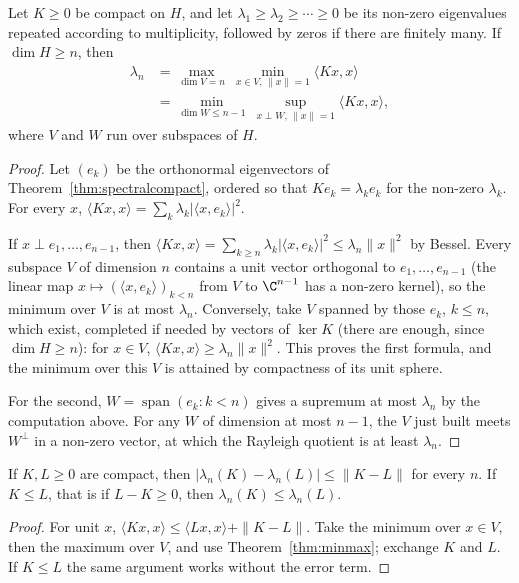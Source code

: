 \begin{theorem}\label{thm:minmax}
Let $K\ge0$ be compact on $H$, and let $\lambda_1\ge\lambda_2\ge\cdots\ge0$ be its non-zero eigenvalues repeated according to multiplicity, followed by zeros if there are finitely many. If $\dim H\ge n$, then
\begin{align*}
\lambda_n&=\max_{\dim V=n}\ \min_{x\in V,\,\|x\|=1}\langle Kx,x\rangle\\
&=\min_{\dim W\le n-1}\ \sup_{x\perp W,\,\|x\|=1}\langle Kx,x\rangle,
\end{align*}
where $V$ and $W$ run over subspaces of $H$.
\end{theorem}
\begin{proof}
Let $(e_k)$ be the orthonormal eigenvectors of Theorem~\ref{thm:spectralcompact}, ordered so that $Ke_k=\lambda_ke_k$ for the non-zero $\lambda_k$. For every $x$, $\langle Kx,x\rangle=\sum_k\lambda_k|\langle x,e_k\rangle|^2$.

If $x\perp e_1,\dots,e_{n-1}$, then $\langle Kx,x\rangle=\sum_{k\ge n}\lambda_k|\langle x,e_k\rangle|^2\le\lambda_n\|x\|^2$ by Bessel. Every subspace $V$ of dimension $n$ contains a unit vector orthogonal to $e_1,\dots,e_{n-1}$ (the
linear map $x\mapsto(\langle x,e_k\rangle)_{k<n}$ from $V$ to $\C^{n-1}$ has a non-zero kernel), so the minimum over $V$ is at most $\lambda_n$. Conversely, take $V$ spanned by those $e_k$, $k\le n$, which exist, completed if needed
by vectors of $\ker K$ (there are enough, since $\dim H\ge n$): for $x\in V$, $\langle Kx,x\rangle\ge\lambda_n\|x\|^2$. This proves the first formula, and the minimum over this $V$ is attained by compactness of its unit sphere.

For the second, $W=\operatorname{span}(e_k:k<n)$ gives a supremum at most $\lambda_n$ by the computation above. For any $W$ of dimension at most $n-1$, the $V$ just built meets $W^\perp$ in a non-zero vector, at which the
Rayleigh quotient is at least $\lambda_n$.
\end{proof}

\begin{corollary}\label{cor:weylpert}
If $K,L\ge0$ are compact, then $|\lambda_n(K)-\lambda_n(L)|\le\|K-L\|$ for every $n$. If $K\le L$, that is if $L-K\ge0$, then $\lambda_n(K)\le\lambda_n(L)$.
\end{corollary}
\begin{proof}
For unit $x$, $\langle Kx,x\rangle\le\langle Lx,x\rangle+\|K-L\|$. Take the minimum over $x\in V$, then the maximum over $V$, and use Theorem~\ref{thm:minmax}; exchange $K$ and $L$. If $K\le L$ the same argument works
without the error term.
\end{proof}


